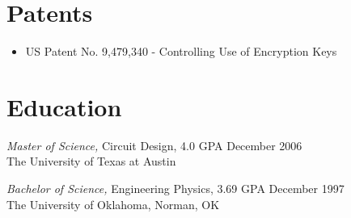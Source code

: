 \documentclass[overlapped]{res}
\begin{document}
\begin{resume}
\section{Patents}
\begin{itemize}
    \item US Patent No. 9,479,340 - Controlling Use of Encryption Keys
\end{itemize}
\section{Education} 
{\sl Master of Science,} Circuit Design, 4.0 GPA \hfill December 2006\\
                The University of Texas at Austin                 

{\sl Bachelor of Science,} Engineering Physics, 3.69 GPA \hfill December 1997\\
                The University of Oklahoma, Norman, OK\\
\end{resume}
\end{document}
